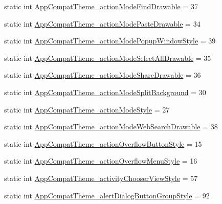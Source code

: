 \begin{DoxyCompactItemize}
\item 
static int \hyperlink{classandroid_1_1support_1_1v7_1_1appcompat_1_1R_1_1styleable_aa802ebe15a40ff9e5965784396ce6a54}{App\+Compat\+Theme\+\_\+action\+Mode\+Find\+Drawable} = 37
\item 
static int \hyperlink{classandroid_1_1support_1_1v7_1_1appcompat_1_1R_1_1styleable_a5db0af8493a36e6db8e132914416ea82}{App\+Compat\+Theme\+\_\+action\+Mode\+Paste\+Drawable} = 34
\item 
static int \hyperlink{classandroid_1_1support_1_1v7_1_1appcompat_1_1R_1_1styleable_a1d1be910b7e7c20247eb09a8f6cae188}{App\+Compat\+Theme\+\_\+action\+Mode\+Popup\+Window\+Style} = 39
\item 
static int \hyperlink{classandroid_1_1support_1_1v7_1_1appcompat_1_1R_1_1styleable_a9daa3ba4c62eccd6f00e0b2c177300cc}{App\+Compat\+Theme\+\_\+action\+Mode\+Select\+All\+Drawable} = 35
\item 
static int \hyperlink{classandroid_1_1support_1_1v7_1_1appcompat_1_1R_1_1styleable_a25ba173dd015eb93ea75a3a0882ee84a}{App\+Compat\+Theme\+\_\+action\+Mode\+Share\+Drawable} = 36
\item 
static int \hyperlink{classandroid_1_1support_1_1v7_1_1appcompat_1_1R_1_1styleable_a98ad62c525f3ba1cf67f00a6acd9f183}{App\+Compat\+Theme\+\_\+action\+Mode\+Split\+Background} = 30
\item 
static int \hyperlink{classandroid_1_1support_1_1v7_1_1appcompat_1_1R_1_1styleable_a8e56a0020ace1566c0563e99c269d0a5}{App\+Compat\+Theme\+\_\+action\+Mode\+Style} = 27
\item 
static int \hyperlink{classandroid_1_1support_1_1v7_1_1appcompat_1_1R_1_1styleable_a0fdd41429fa2dd5551582ce389ca7ccb}{App\+Compat\+Theme\+\_\+action\+Mode\+Web\+Search\+Drawable} = 38
\item 
static int \hyperlink{classandroid_1_1support_1_1v7_1_1appcompat_1_1R_1_1styleable_a5f0827c31aa835ebff88c10bb4cb11bb}{App\+Compat\+Theme\+\_\+action\+Overflow\+Button\+Style} = 15
\item 
static int \hyperlink{classandroid_1_1support_1_1v7_1_1appcompat_1_1R_1_1styleable_a50068fdeae95834f3e3fdd6649df494c}{App\+Compat\+Theme\+\_\+action\+Overflow\+Menu\+Style} = 16
\item 
static int \hyperlink{classandroid_1_1support_1_1v7_1_1appcompat_1_1R_1_1styleable_a0023b350c96a4afa01a44c9f0bf8a3a1}{App\+Compat\+Theme\+\_\+activity\+Chooser\+View\+Style} = 57
\item 
static int \hyperlink{classandroid_1_1support_1_1v7_1_1appcompat_1_1R_1_1styleable_a2887029a2a12510cb561a99124ec7bdf}{App\+Compat\+Theme\+\_\+alert\+Dialog\+Button\+Group\+Style} = 92

\end{DoxyCompactItemize}
